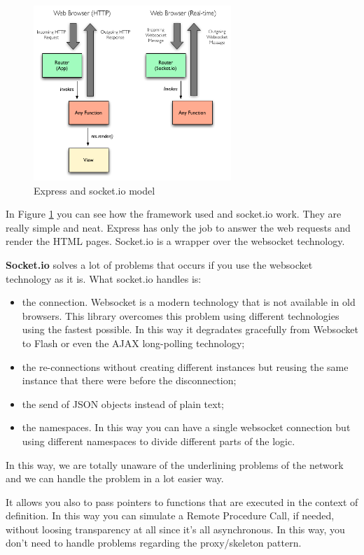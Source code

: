 \begin{figure}[H]
\centering %
\includegraphics[height=250px]{img/express.png}
\caption{Express and socket.io model}
\label{fig:expressSocketio}
\end{figure}

In Figure \ref{fig:expressSocketio} you can see how the framework used and socket.io work. They are really simple and neat. Express has only the job to answer the web requests and render the HTML pages. Socket.io is a wrapper over the websocket technology.

\textbf{Socket.io} solves a lot of problems that occurs if you use the websocket technology as it is. What socket.io handles is:
\begin{itemize}
\item the connection. Websocket is a modern technology that is not available in old browsers. This library overcomes this problem using different technologies using the fastest possible. In this way it degradates gracefully from Websocket to Flash or even the AJAX long-polling technology;
\item the re-connections without creating different instances but reusing the same instance that there were before the disconnection;
\item the send of JSON objects instead of plain text;
\item the namespaces. In this way you can have a single websocket connection but using different namespaces to divide different parts of the logic.
\end{itemize}

In this way, we are totally unaware of the underlining problems of the network and we can handle the problem in a lot easier way.

It allows you also to pass pointers to functions that are executed in the context of definition. In this way you can simulate a Remote Procedure Call, if needed, without loosing transparency at all since it's all asynchronous. In this way, you don't need to handle problems regarding the proxy/skeleton pattern.


